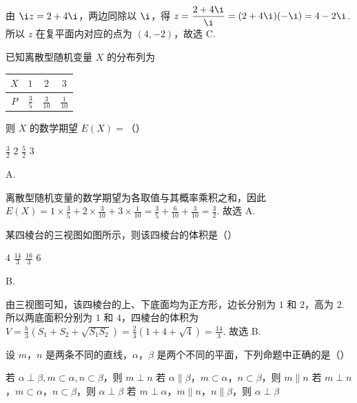 \begin{solution}
由 \(\i z=2+4\i\)，两边同除以 \(\i\)，得 \(z=\dfrac{2+4\i}{\i}=(2+4\i)(-\i)=4-2\i\). 所以 \(z\) 在复平面内对应的点为 \((4,-2)\)，故选 C.
\end{solution}

\begin{problem}
已知离散型随机变量 \(X\) 的分布列为

\begin{center}
\begin{tabular}{c|ccc}
\(X\) & \(1\) & \(2\) & \(3\) \\
\hline
\(P\) & \(\frac{3}{5}\) & \(\frac{3}{10}\) & \(\frac{1}{10}\)
\end{tabular}
\end{center}

则 \(X\) 的数学期望 \(E(X) =\)（\quad）

\choices
    {\(\frac{3}{2}\)}
    {\(2\)}
    {\(\frac{5}{2}\)}
    {\(3\)}
\end{problem}

\begin{answer}
A.
\end{answer}

\begin{solution}
离散型随机变量的数学期望为各取值与其概率乘积之和，因此
\(E(X)=1\times\frac35+2\times\frac3{10}+3\times\frac1{10}=\frac35+\frac6{10}+\frac3{10}=\frac32\). 故选 A.
\end{solution}

\begin{problem}
某四棱台的三视图如图所示，则该四棱台的体积是（\quad）


\choices
    {\(4\)}
    {\(\frac{14}{3}\)}
    {\(\frac{16}{3}\)}
    {\(6\)}
\end{problem}

\begin{answer}
B.
\end{answer}

\begin{solution}
由三视图可知，该四棱台的上、下底面均为正方形，边长分别为 \(1\) 和 \(2\)，高为 \(2\). 所以两底面积分别为 \(1\) 和 \(4\)，四棱台的体积为
\(V=\frac{h}{3}\left(S_1+S_2+\sqrt{S_1S_2}\right)=\frac23\left(1+4+\sqrt4\right)=\frac{14}{3}\). 故选 B.
\end{solution}

\begin{problem}
设 \(m\)，\(n\) 是两条不同的直线，\(\alpha\)，\(\beta\) 是两个不同的平面，下列命题中正确的是（\quad）

\choices
    {若 \(\alpha \perp \beta, m \subset \alpha, n \subset \beta\)，则 \(m \perp n\)}
    {若 \(\alpha \parallel \beta\)，\(m \subset \alpha\)，\(n \subset \beta\)，则 \(m \parallel n\)}
    {若 \(m \perp n\)，\(m \subset \alpha\)，\(n \subset \beta\)，则 \(\alpha \perp \beta\)}
    {若 \(m \perp \alpha\)，\(m \parallel n\)，\(n \parallel \beta\)，则 \(\alpha \perp \beta\)}
\end{problem}

